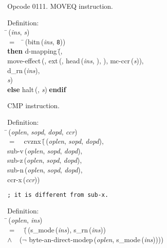  Opcode 0111.
 MOVEQ instruction.
\begin{tabbing}{\sc Definition}: \\  
\=\,({\it{ins\/}}, {\it{s\/}}) \\ 
$=$$\;\;\;\;$\=\,({\rm{bitn}}\,({\it{ins\/}}, {\tt{8}})) \\ 
{\bf then }{\rm{d-mapping}}\,(\=, \\ 
{\rm{move-effect}}\,({}, {\rm{ext}}\,({}, {\rm{head}}\,({\it{ins\/}}, {}), {}), {\rm{mc-ccr}}\,({\it{s\/}})), \\ 
{\rm{d\_rn}}\,({\it{ins\/}}), \\ 
{\it{s\/}})\- \\ 
{\bf else }{\rm{halt}}\,({}, {\it{s\/}})$\;${\bf  endif}\-\-
\end{tabbing}

 CMP instruction.
\begin{tabbing}{\sc Definition}: \\  
\=\,({\it{oplen\/}}, {\it{sopd\/}}, {\it{dopd\/}}, {\it{ccr\/}}) \\ 
$=$$\;\;\;\;${\rm{cvznx}}\,(\=\,({\it{oplen\/}}, {\it{sopd\/}}, {\it{dopd\/}}), \\ 
{\rm{sub-v}}\,({\it{oplen\/}}, {\it{sopd\/}}, {\it{dopd\/}}), \\ 
{\rm{sub-z}}\,({\it{oplen\/}}, {\it{sopd\/}}, {\it{dopd\/}}), \\ 
{\rm{sub-n}}\,({\it{oplen\/}}, {\it{sopd\/}}, {\it{dopd\/}}), \\ 
{\rm{ccr-x}}\,({\it{ccr\/}}))\-\-
\end{tabbing}                \begin{verbatim}; it is different from sub-x.  

\end{verbatim}\begin{tabbing}{\sc Definition}: \\  
\=\,({\it{oplen\/}}, {\it{ins\/}}) \\ 
$=$$\;\;\;\;$(\=\,({\rm{s\_mode}}\,({\it{ins\/}}), {\rm{s\_rn}}\,({\it{ins\/}})) \\ 
$\wedge$$\;\;\;\;$($\neg$ {\rm{byte-an-direct-modep}}\,({\it{oplen\/}}, {\rm{s\_mode}}\,({\it{ins\/}}))))\-\-
\end{tabbing}
        

